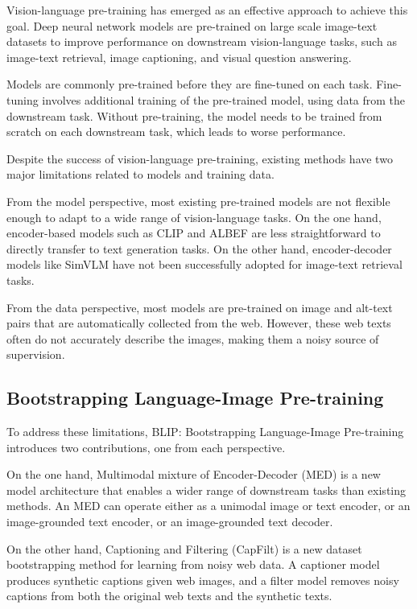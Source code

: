 \documentclass[11pt]{article}
\begin{document}
Vision-language pre-training has emerged as an effective approach to achieve this goal. Deep neural network models are pre-trained on large scale image-text datasets to improve performance on downstream vision-language tasks, such as image-text retrieval, image captioning, and visual question answering.

Models are commonly pre-trained before they are fine-tuned on each task. Fine-tuning involves additional training of the pre-trained model, using data from the downstream task. Without pre-training, the model needs to be trained from scratch on each downstream task, which leads to worse performance.

Despite the success of vision-language pre-training, existing methods have two major limitations related to models and training data.

From the model perspective, most existing pre-trained models are not flexible enough to adapt to a wide range of vision-language tasks. On the one hand, encoder-based models such as CLIP \cite{radford2021learning} and ALBEF \cite{li2021align} are less straightforward to directly transfer to text generation tasks. On the other hand, encoder-decoder models like SimVLM \cite{wang2021simvlm} have not been successfully adopted for image-text retrieval tasks.

From the data perspective, most models are pre-trained on image and alt-text pairs that are automatically collected from the web. However, these web texts often do not accurately describe the images, making them a noisy source of supervision.

\subsection{Bootstrapping Language-Image Pre-training}

To address these limitations, BLIP: Bootstrapping Language-Image Pre-training \cite{li2022blip} introduces two contributions, one from each perspective.

On the one hand, Multimodal mixture of Encoder-Decoder (MED) is a new model architecture that enables a wider range of downstream tasks than existing methods. An MED can operate either as a unimodal image or text encoder, or an image-grounded text encoder, or an image-grounded text decoder.

On the other hand, Captioning and Filtering (CapFilt) is a new dataset bootstrapping method for learning from noisy web data. A captioner model produces synthetic captions given web images, and a filter model removes noisy captions from both the original web texts and the synthetic texts.
\end{document}
